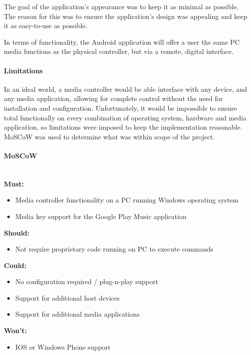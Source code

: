 \documentclass{article}
\begin{document}
				The goal of the application's appearance was to keep it as minimal as possible. The reason for this was to ensure the application's design was appealing and keep it as easy-to-use as possible.
				
				In terms of functionality, the Android application will offer a user the same PC media functions as the physical controller, but via a remote, digital interface.
							
			\paragraph{Limitations}
				In an ideal world, a media controller would be able interface with any device, and any media application, allowing for complete control without the need for installation and configuration. Unfortunately, it would be impossible to ensure total functionally on every combination of operating system, hardware and media application, so limitations were imposed to keep the implementation reasonable. MoSCoW was used to determine what was within scope of the project.

			\begin{minipage}{\textwidth}\label{MoSCoW}
				\paragraph{MoSCoW}
					\noindent\\
					\textbf{Must:}
						\begin{itemize}
							\item Media controller functionality on a PC running Windows operating system
							\item Media key support for the Google Play Music application
						\end{itemize}			
					\textbf{Should:}
						\begin{itemize}
							\item Not require proprietary code running on PC to execute commands
						\end{itemize}
					\textbf{Could:}
						\begin{itemize}
							\item No configuration required / plug-n-play support
							\item Support for additional host devices
							\item Support for additional media applications
						\end{itemize}
					\textbf{Won't:}
						\begin{itemize}
							\item IOS or Windows Phone support
						\end{itemize}
				\end{minipage}
				
\end{document}
